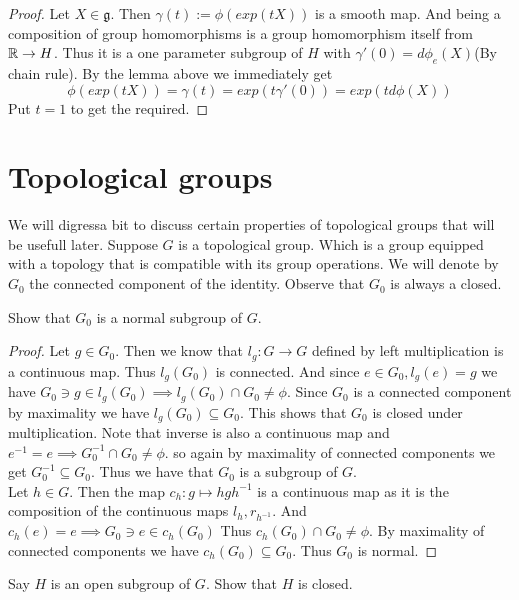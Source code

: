 \documentclass{article}
\begin{document}
\begin{proof}
    Let $X\in \mathfrak{g}$. Then $\gamma(t):=\phi(exp(tX))$ is a smooth map. And being a composition of group homomorphisms is a group homomorphism itself from $\mathbb R \to H$. Thus it is a one parameter subgroup of $H$
    with $\gamma'(0) = d\phi_e(X)$(By chain rule). By the lemma above we immediately get $$\phi(exp(tX)) = \gamma(t) = exp(t\gamma'(0)) = exp(td\phi(X))$$
    Put $t=1$ to get the required.
\end{proof}

\section*{Topological groups}

We will digressa bit to discuss certain properties of topological groups that will be usefull later.
Suppose $G$ is a topological group. Which is a group equipped with a topology that is compatible with its group operations. 
We will denote by $G_0$ the connected component of the identity. Observe that $G_0$ is always a closed.

\begin{exercise*}
    Show that $G_0$ is a normal subgroup of $G$.
\end{exercise*}

\begin{proof}
    Let $g\in G_0$. Then we know that $l_g:G\to G$ defined by left multiplication is a continuous map. Thus $l_g(G_0)$ is connected. And since $e\in G_0,l_g(e)=g$ we have $G_0\ni g\in l_g(G_0)\implies l_g(G_0)\cap G_0\neq \phi$.
    Since $G_0$ is a connected component by maximality we have $l_g(G_0)\subseteq G_0$. This shows that $G_0$ is closed under multiplication. Note that inverse is also a continuous map and $e^{-1}=e\implies G_0^{-1}\cap G_0\neq \phi$.
    so again by maximality of connected components we get $G_0^{-1}\subseteq G_0$. Thus we have that $G_0$ is a subgroup of $G$.\\
    Let $h\in G$. Then the map $c_h:g\mapsto hgh^{-1}$ is a continuous map as it is the composition of the continuous maps $l_h,r_{h^{-1}}$. And $c_h(e)=e\implies G_0\ni e\in c_h(G_0)$
    Thus $c_h(G_0)\cap G_0\neq \phi$. By maximality of connected components we have $c_h(G_0)\subseteq G_0$. Thus $G_0$ is normal.
\end{proof}

\begin{exercise*}
    Say $H$ is an open subgroup of $G$. Show that $H$ is closed.
\end{exercise*}
\end{document}
